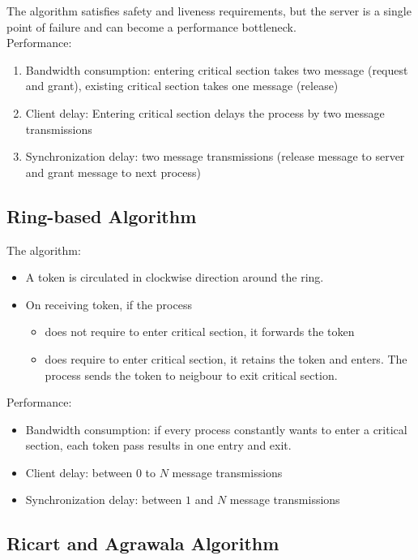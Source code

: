 \begin{multicols*}{2}
\noindent The algorithm satisfies safety and liveness requirements, but the server is a single point of failure and can become a performance bottleneck. \\

\noindent Performance:

\begin{enumerate}
  \item Bandwidth consumption: entering critical section takes two message (request and grant), existing critical section takes one message (release)
  \item Client delay: Entering critical section delays the process by two message transmissions
  \item Synchronization delay: two message transmissions (release message to server and grant message to next process)
\end{enumerate}

\subsection{Ring-based Algorithm}

\noindent The algorithm:
\begin{itemize}
  \item A token is circulated in clockwise direction around the ring.
  \item On receiving token, if the process 
  \begin{itemize}
    \item does not require to enter critical section, it forwards the token
    \item does require to enter critical section, it retains the token and enters. The process sends the token to neigbour to exit critical section. 
  \end{itemize}
\end{itemize}

\noindent Performance:

\begin{itemize}
  \item Bandwidth consumption: if every process constantly wants to enter a critical section, each token pass results in one entry and exit.
  \item Client delay: between $0$ to $N$ message transmissions
  \item Synchronization delay: between $1$ and $N$ message transmissions
\end{itemize}

\subsection{Ricart and Agrawala Algorithm}


\end{multicols*}
